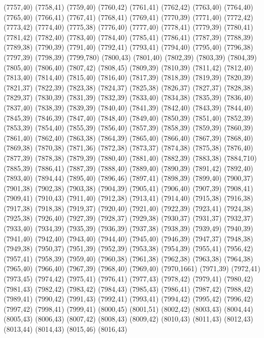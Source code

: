 (7757,40)
(7758,41)
(7759,40)
(7760,42)
(7761,41)
(7762,42)
(7763,40)
(7764,40)
(7765,40)
(7766,41)
(7767,41)
(7768,41)
(7769,41)
(7770,39)
(7771,40)
(7772,42)
(7773,42)
(7774,40)
(7775,38)
(7776,40)
(7777,40)
(7778,41)
(7779,39)
(7780,41)
(7781,42)
(7782,40)
(7783,40)
(7784,40)
(7785,41)
(7786,41)
(7787,39)
(7788,39)
(7789,38)
(7790,39)
(7791,40)
(7792,41)
(7793,41)
(7794,40)
(7795,40)
(7796,38)
(7797,39)
(7798,39)
(7799,780)
(7800,43)
(7801,40)
(7802,39)
(7803,39)
(7804,39)
(7805,40)
(7806,40)
(7807,42)
(7808,45)
(7809,39)
(7810,39)
(7811,42)
(7812,40)
(7813,40)
(7814,40)
(7815,40)
(7816,40)
(7817,39)
(7818,39)
(7819,39)
(7820,39)
(7821,37)
(7822,39)
(7823,38)
(7824,37)
(7825,38)
(7826,37)
(7827,37)
(7828,38)
(7829,37)
(7830,39)
(7831,39)
(7832,39)
(7833,40)
(7834,38)
(7835,39)
(7836,40)
(7837,40)
(7838,39)
(7839,39)
(7840,40)
(7841,39)
(7842,40)
(7843,39)
(7844,40)
(7845,39)
(7846,39)
(7847,40)
(7848,40)
(7849,40)
(7850,39)
(7851,40)
(7852,39)
(7853,39)
(7854,40)
(7855,39)
(7856,40)
(7857,39)
(7858,39)
(7859,39)
(7860,39)
(7861,40)
(7862,40)
(7863,38)
(7864,39)
(7865,40)
(7866,40)
(7867,39)
(7868,40)
(7869,38)
(7870,38)
(7871,36)
(7872,38)
(7873,37)
(7874,38)
(7875,38)
(7876,40)
(7877,39)
(7878,38)
(7879,39)
(7880,40)
(7881,40)
(7882,39)
(7883,38)
(7884,710)
(7885,39)
(7886,41)
(7887,39)
(7888,40)
(7889,40)
(7890,39)
(7891,42)
(7892,40)
(7893,40)
(7894,44)
(7895,40)
(7896,46)
(7897,41)
(7898,39)
(7899,40)
(7900,37)
(7901,38)
(7902,38)
(7903,38)
(7904,39)
(7905,41)
(7906,40)
(7907,39)
(7908,41)
(7909,41)
(7910,43)
(7911,40)
(7912,38)
(7913,41)
(7914,40)
(7915,38)
(7916,38)
(7917,38)
(7918,38)
(7919,37)
(7920,40)
(7921,40)
(7922,39)
(7923,41)
(7924,38)
(7925,38)
(7926,40)
(7927,39)
(7928,37)
(7929,38)
(7930,37)
(7931,37)
(7932,37)
(7933,40)
(7934,39)
(7935,39)
(7936,39)
(7937,38)
(7938,39)
(7939,49)
(7940,39)
(7941,40)
(7942,40)
(7943,40)
(7944,40)
(7945,40)
(7946,39)
(7947,37)
(7948,38)
(7949,38)
(7950,37)
(7951,39)
(7952,39)
(7953,38)
(7954,39)
(7955,41)
(7956,42)
(7957,41)
(7958,39)
(7959,40)
(7960,38)
(7961,38)
(7962,38)
(7963,38)
(7964,38)
(7965,40)
(7966,40)
(7967,39)
(7968,40)
(7969,40)
(7970,1661)
(7971,39)
(7972,41)
(7973,45)
(7974,42)
(7975,41)
(7976,41)
(7977,43)
(7978,42)
(7979,41)
(7980,42)
(7981,43)
(7982,42)
(7983,42)
(7984,43)
(7985,43)
(7986,41)
(7987,42)
(7988,42)
(7989,41)
(7990,42)
(7991,43)
(7992,41)
(7993,41)
(7994,42)
(7995,42)
(7996,42)
(7997,42)
(7998,41)
(7999,41)
(8000,45)
(8001,51)
(8002,42)
(8003,43)
(8004,44)
(8005,43)
(8006,43)
(8007,42)
(8008,43)
(8009,42)
(8010,43)
(8011,43)
(8012,43)
(8013,44)
(8014,43)
(8015,46)
(8016,43)
